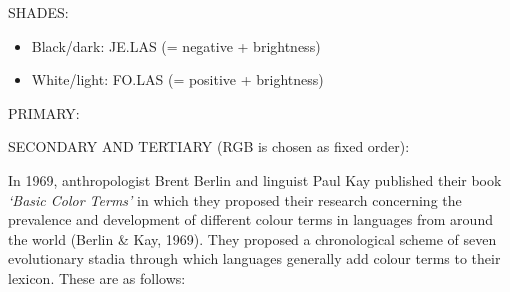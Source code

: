 SHADES: 
\begin{itemize}

\item    Black/dark: JE.LAS \je \las (= negative + brightness) 

    \item White/light: FO.LAS \fo \las (= positive + brightness) 
\end{itemize}
\quad

PRIMARY: 
\quad


SECONDARY AND TERTIARY (RGB is chosen as fixed order): 


In 1969, anthropologist Brent Berlin and linguist Paul Kay published their book \textit{‘Basic Color Terms’} in which they proposed their research concerning the prevalence and development of different colour terms in languages from around the world (Berlin \& Kay, 1969). They proposed a chronological scheme of seven evolutionary stadia through which languages generally add colour terms to their lexicon. These are as follows: 

